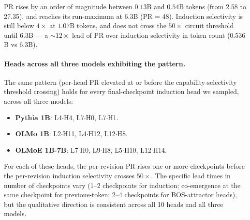 \documentclass[11pt]{article}
\begin{document}
PR rises by an order of magnitude between $0.13$B and $0.54$B tokens
(from 2.58 to 27.35), and reaches its run-maximum at $6.3$B (PR = 48).
Induction selectivity is still below $4\times$ at $1.07$B tokens, and
does not cross the $50\times$ circuit threshold until $6.3$B --- a
$\sim 12\times$ lead of PR over induction selectivity in token count
($0.536$B vs $6.3$B).

\paragraph{Heads across all three models exhibiting the pattern.}
The same pattern (per-head PR elevated at or before the
capability-selectivity threshold crossing) holds for every
final-checkpoint induction head we sampled, across all three models:

\begin{itemize}
  \item \textbf{Pythia 1B}: L4$\cdot$H4, L7$\cdot$H0, L7$\cdot$H1.
  \item \textbf{OLMo 1B}: L2$\cdot$H11, L4$\cdot$H12, L12$\cdot$H8.
  \item \textbf{OLMoE 1B-7B}: L7$\cdot$H0, L9$\cdot$H8, L5$\cdot$H10,
        L12$\cdot$H14.
\end{itemize}

For each of these heads, the per-revision PR rises one or more checkpoints
before the per-revision induction selectivity crosses $50\times$. The
specific lead times in number of checkpoints vary
(1--2 checkpoints for induction; co-emergence at the same checkpoint for
previous-token; 2--4 checkpoints for BOS-attractor heads), but the
qualitative direction is consistent across all 10 heads and all three
models.
\end{document}
